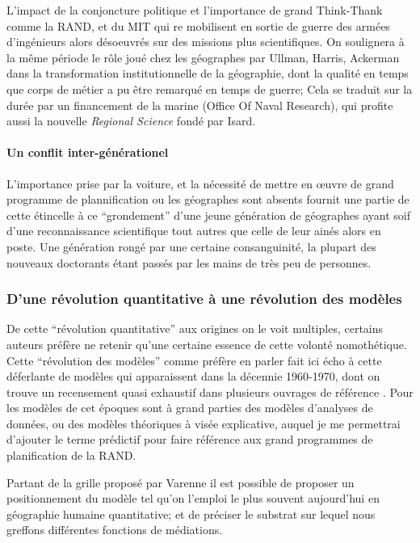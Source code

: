{L'impact de la conjoncture politique et l'importance de grand Think-Thank comme la RAND, et du MIT qui re mobilisent en sortie de guerre des armées d'ingénieurs alors désoeuvrés sur des missions plus scientifiques. On soulignera à la même période le rôle joué chez les géographes par Ullman, Harris, Ackerman dans la transformation institutionnelle de la géographie, dont la qualité en temps que corps de métier a pu être remarqué en temps de guerre; Cela se traduit sur la durée par un financement de la marine (Office Of Naval Research), qui profite aussi la nouvelle \textit{Regional Science} fondé par Isard.

\paragraph{Un conflit inter-générationel}

L'importance prise par la voiture, et la nécessité de mettre en œuvre de grand programme de plannification ou les géographes sont absents fournit une partie de cette étincelle à ce \enquote{grondement} d'une jeune génération de géographes ayant soif d'une reconnaissance scientifique tout autres que celle de leur ainés \autocite{Harvey1969} alors en poste. Une génération rongé par une certaine consanguinité, la plupart des nouveaux doctorants étant passés par les mains de très peu de personnes. \autocite[49-50]{Glick1988}

\subsubsection{D'une révolution quantitative à une révolution des modèles}

De cette \enquote{révolution quantitative} aux origines on le voit multiples, certains auteurs préfère ne retenir qu'une certaine essence de cette volonté nomothétique. Cette \enquote{révolution des modèles} comme préfère en parler \textcite{Wilson1970} \autocite{Varenne2014} fait ici écho à cette déferlante de modèles qui apparaissent dans la décennie 1960-1970, dont on trouve un recensement quasi exhaustif dans plusieurs ouvrages de référence \autocite{Haggett1965,Chorley1967}. Pour \autocite{Varenne2014} les modèles de cet époques sont à grand parties des modèles d'analyses de données, ou des modèles théoriques à visée explicative, auquel je me permettrai d'ajouter le terme prédictif pour faire référence aux grand programmes de planification de la RAND.

Partant de la grille proposé par Varenne \autocite{Varenne2013} il est possible de proposer un positionnement du modèle tel qu'on l'emploi le plus souvent aujourd'hui en géographie humaine quantitative; et de préciser le substrat sur lequel nous greffons différentes fonctions de médiations.

}
